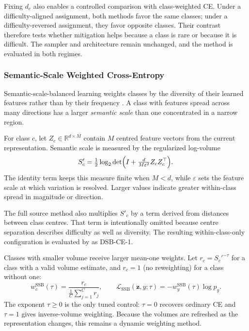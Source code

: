 \documentclass[11pt]{article}
\begin{document}
Fixing $d_c$ also enables a controlled comparison with class-weighted CE. Under a difficulty-aligned assignment, both methods favor the same classes; under a difficulty-reversed assignment, they favor opposite classes. Their contrast therefore tests whether mitigation helps because a class is rare or because it is difficult. The sampler and architecture remain unchanged, and the method is evaluated in both regimes.

\subsubsection{Semantic-Scale Weighted Cross-Entropy}
\label{sec:ssb}
Semantic-scale-balanced learning weights classes by the diversity of their learned features rather than by their frequency \citep{ma2023semanticScale}. A class with features spread across many directions has a larger \emph{semantic scale} than one concentrated in a narrow region.

For class $c$, let $Z_c\in\mathbb R^{d\times M}$ contain $M$ centred feature vectors from the current representation. Semantic scale is measured by the regularized log-volume
\begin{equation}
  S'_c=\tfrac{1}{2}\log_2\det\Bigl(I+\tfrac{d}{M\varepsilon^{2}}Z_cZ_c^{\top}\Bigr).
  \label{eq:semantic-volume}
\end{equation}
\noindent The identity term keeps this measure finite when $M<d$, while $\varepsilon$ sets the feature scale at which variation is resolved. Larger values indicate greater within-class spread in magnitude or direction.

The full source method also multiplies $S'_c$ by a term derived from distances between class centres. That term is intentionally omitted because centre separation describes difficulty as well as diversity. The resulting within-class-only configuration is evaluated by \citet{ma2023semanticScale} as DSB-CE-1.

Classes with smaller volume receive larger mean-one weights. Let $r_c=S_c'^{-\tau}$ for a class with a valid volume estimate, and $r_c=1$ (no reweighting) for a class without one:
\begin{equation}
  w_c^{\mathrm{SSB}}(\tau)=
  \frac{r_c}
       {\frac{1}{C}\sum_{j=1}^{C}r_j},
  \qquad
  \mathcal{L}_{\mathrm{SSB}}(\mathbf z,y;\tau)=-w_y^{\mathrm{SSB}}(\tau)\log p_y.
  \label{eq:ssb-weight}
\end{equation}
\noindent The exponent $\tau\geq0$ is the only tuned control: $\tau=0$ recovers ordinary CE and $\tau=1$ gives inverse-volume weighting. Because the volumes are refreshed as the representation changes, this remains a dynamic weighting method.
\end{document}

